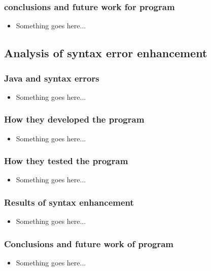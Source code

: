 \documentclass{beamer}
\begin{document}
\begin{frame}
	\frametitle{conclusions and future work for program}
		\begin{itemize}
			\item Something goes here...
		\end{itemize}

\end{frame}

\subsection[Syntax error enhancement]{Analysis of syntax error enhancement}

\begin{frame}
	\frametitle{Java and syntax errors}
		\begin{itemize}
			\item Something goes here...
		\end{itemize}

\end{frame}

\begin{frame}
	\frametitle{How they developed the program}
		\begin{itemize}
			\item Something goes here...
		\end{itemize}

\end{frame}

\begin{frame}
	\frametitle{How they tested the program}
		\begin{itemize}
			\item Something goes here...
		\end{itemize}

\end{frame}

\begin{frame}
	\frametitle{Results of syntax enhancement}
		\begin{itemize}
			\item Something goes here...
		\end{itemize}

\end{frame}

\begin{frame}
	\frametitle{Conclusions and future work of program}
		\begin{itemize}
			\item Something goes here...
		\end{itemize}

\end{frame}
\end{document}
